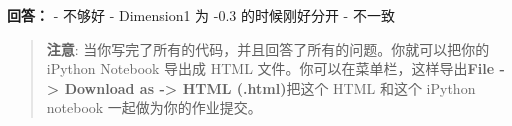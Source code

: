 \documentclass[11pt]{article}
\begin{document}
    \textbf{回答：} - 不够好 - Dimension1 为 -0.3 的时候刚好分开 - 不一致

    \begin{quote}
\textbf{注意}:
当你写完了所有的代码，并且回答了所有的问题。你就可以把你的 iPython
Notebook 导出成 HTML 文件。你可以在菜单栏，这样导出\textbf{File
-\textgreater{} Download as -\textgreater{} HTML (.html)}把这个 HTML
和这个 iPython notebook 一起做为你的作业提交。
\end{quote}


    
    
    
    
\end{document}
